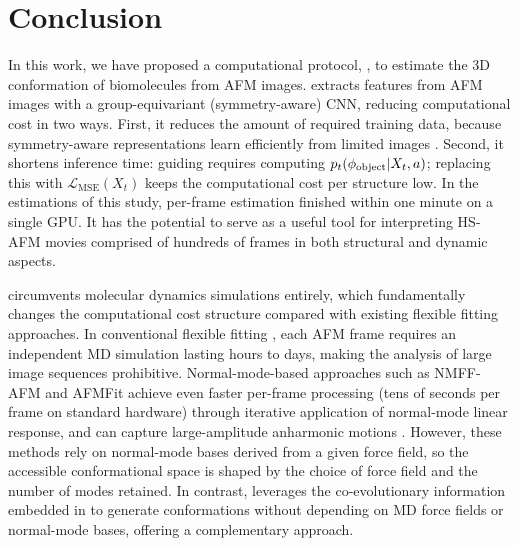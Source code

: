 \section{Conclusion}

In this work, we have proposed a computational protocol, \Model, to estimate the 3D conformation of biomolecules from AFM images. 
\Model extracts features from AFM images with a group-equivariant (symmetry-aware) CNN, reducing computational cost in two ways.
First, it reduces the amount of required training data, because symmetry-aware representations learn efficiently from limited images \cite{e2cnn}.
Second, it shortens inference time: guiding \AFiii requires computing $p_t(\phi_{\text{object}} | X_t, a)$; replacing this with $\mathcal{L}_{\text{MSE}}(X_t)$ keeps the computational cost per structure low.
In the estimations of this study, per-frame estimation finished within one minute on a single GPU.
It has the potential to serve as a useful tool for interpreting HS-AFM movies comprised of hundreds of frames in both structural and dynamic aspects.

\Model circumvents molecular dynamics simulations entirely, which fundamentally changes the computational cost structure compared with existing flexible fitting approaches.
In conventional flexible fitting \cite{Niina2020, ngo2025atomic}, each AFM frame requires an independent MD simulation lasting hours to days, making the analysis of large image sequences prohibitive.
Normal-mode-based approaches such as NMFF-AFM \cite{Wu2024} and AFMFit \cite{Vuillemot2025AFMfit} achieve even faster per-frame processing (tens of seconds per frame on standard hardware) through iterative application of normal-mode linear response, and can capture large-amplitude anharmonic motions \cite{amyot_flexible_2025}.
However, these methods rely on normal-mode bases derived from a given force field, so the accessible conformational space is shaped by the choice of force field and the number of modes retained.
In contrast, \Model leverages the co-evolutionary information embedded in \AFiii to generate conformations without depending on MD force fields or normal-mode bases, offering a complementary approach.

